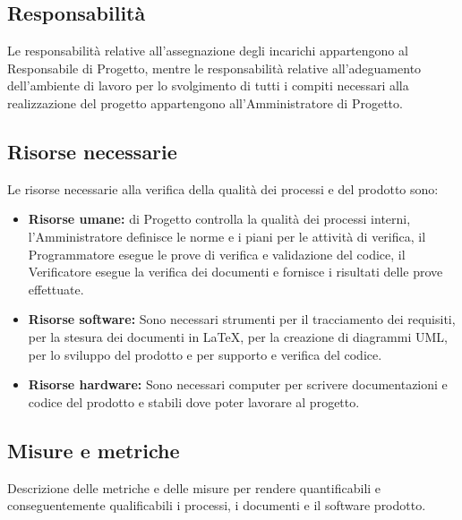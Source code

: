 	\subsection{Responsabilità}
	Le responsabilità relative all'assegnazione degli incarichi appartengono al Responsabile di Progetto, mentre le responsabilità relative all'adeguamento dell'ambiente di lavoro per lo svolgimento di tutti i compiti necessari alla realizzazione del progetto appartengono all'Amministratore di Progetto.

	\subsection{Risorse necessarie}
	Le risorse necessarie alla verifica della qualità dei processi e del prodotto sono:
		\begin{itemize}
  			\item \textbf{Risorse umane:} \textnormal{di Progetto controlla la qualità dei processi interni, l'Amministratore definisce le norme e i piani per le attività di verifica, il Programmatore esegue le prove di verifica e validazione del codice, il Verificatore esegue la verifica dei documenti e fornisce i risultati delle prove effettuate.}
  			\item \textbf{Risorse software:} \textnormal{Sono necessari strumenti per il tracciamento dei requisiti, per la stesura dei documenti in \LaTeX, per la creazione di diagrammi UML, per lo sviluppo del prodotto e per supporto e verifica del codice.}
  			\item \textbf{Risorse hardware:} \textnormal{Sono necessari computer per scrivere documentazioni e codice del prodotto e stabili dove poter lavorare al progetto.}
		\end{itemize}
		
	\subsection{Misure e metriche}
	Descrizione delle metriche e delle misure per rendere quantificabili e conseguentemente qualificabili i processi, i documenti e il software prodotto.

